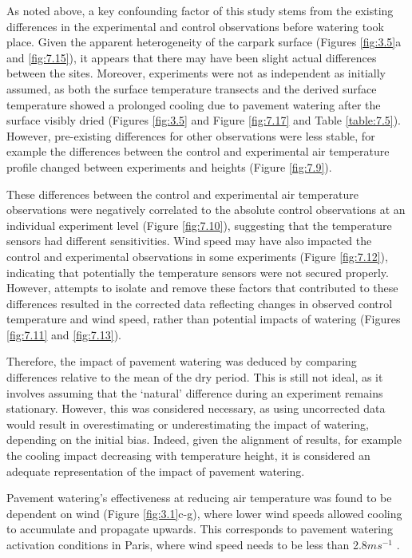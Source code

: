 \documentclass[final,3p,times,authoryear]{elsarticle}
\begin{document}
As noted above, a key confounding factor of this study stems from the existing differences in the experimental and control observations before watering took place. Given the apparent heterogeneity of the carpark surface (Figures \ref{fig:3.5}a and \ref{fig:7.15}), it appears that there may have been slight actual differences between the sites. Moreover, experiments were not as independent as initially assumed, as both the surface temperature transects and the derived surface temperature showed a prolonged cooling due to pavement watering after the surface visibly dried (Figures \ref{fig:3.5} and Figure \ref{fig:7.17} and Table \ref{table:7.5}). However, pre-existing differences for other observations were less stable, for example the differences between the control and experimental air temperature profile changed between experiments and heights (Figure \ref{fig:7.9}).

These differences between the control and experimental air temperature observations
were negatively correlated to the absolute control observations at an individual
experiment level (Figure \ref{fig:7.10}), suggesting that the temperature sensors had different sensitivities. Wind speed may have also impacted the control and experimental
observations in some experiments (Figure \ref{fig:7.12}), indicating that potentially the
temperature sensors were not secured properly. However, attempts to isolate and
remove these factors that contributed to these differences resulted in the corrected data reflecting changes in observed control temperature and wind speed, rather than potential
impacts of watering (Figures \ref{fig:7.11} and \ref{fig:7.13}).

Therefore, the impact of pavement watering was deduced by comparing differences
relative to the mean of the dry period. This is still not ideal, as it involves assuming that the `natural' difference during an experiment remains stationary. However, this was
considered necessary, as using uncorrected data would result in overestimating or
underestimating the impact of watering, depending on the initial bias. Indeed, given the
alignment of results, for example the cooling impact decreasing with temperature
height, it is considered an adequate representation of the impact of pavement watering.

Pavement watering's effectiveness at reducing air temperature was found to be
dependent on wind (Figure \ref{fig:3.1}c-g), where lower wind speeds allowed cooling to
accumulate and propagate upwards. This corresponds to pavement watering activation
conditions in Paris, where wind speed needs to be less than 2.8$ms^{-1}$ \citep{Hendel2015a}.
\end{document}
